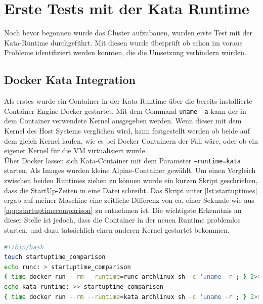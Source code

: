 \section{Erste Tests mit der Kata Runtime}
\label{ref:lokale_kata_tests}
Noch bevor begonnen wurde das Cluster aufzubauen, wurden erste Test mit der Kata-Runtime durchgeführt. 
Mit diesen wurde überprüft ob schon im voraus Probleme identifiziert werden konnten, die die Umsetzung verhindern würden. 

\subsection{Docker Kata Integration}
Als erstes wurde ein Container in der Kata Runtime über die bereits installierte Container Engine Docker gestartet.
Mit dem Command \texttt{uname -a} kann der in dem Container verwendete Kernel ausgegeben werden. 
Wenn dieser mit dem Kernel des Host Systems verglichen wird, kann festgestellt werden ob beide auf dem gleich Kernel laufen, wie es bei Docker Containern der Fall wäre, oder ob ein eigener Kernel für die VM virtualisiert wurde.
\\
Über Docker lassen sich Kata-Container mit dem Parameter \texttt{--runtime=kata} starten.
Als Images wurden kleine Alpine-Container gewählt.
Um einen Vergleich zwischen beiden Runtimes ziehen zu können wurde ein kurzen Skript geschrieben, dass die StartUp-Zeiten in eine Datei schreibt.
Das Skript unter \ref{lst:startuptimes} ergab auf meiner Maschine eine zeitliche Differenz von ca. einer Sekunde wie aus \ref{app:startuptimecomparison} zu entnehmen ist. 
Die wichtigste Erkenntnis an dieser Stelle ist jedoch, dass die Container in der neuen Runtime problemlos starten, und dazu tatsächlich einen anderen Kernel gestartet bekommen.

\begin{lstlisting}[language=bash, caption={compare\_startup\_times.sh}, label=lst:startuptimes]
#!/bin/bash
touch startuptime_comparison
echo runc: > startuptime_comparison
{ time docker run --rm --runtime=runc archlinux sh -c 'uname -r'; } 2>> startuptime_comparison
echo kata-runtime: >> startuptime_comparison
{ time docker run --rm --runtime=kata archlinux sh -c 'uname -r'; } 2>> startuptime_comparison
\end{lstlisting}

